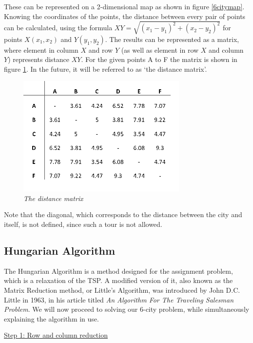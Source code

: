 \noindent These can be represented on a 2-dimensional map as shown in figure \ref{6citymap}. Knowing the coordinates of the points, the distance between every pair of points can be calculated, using the formula $XY=\sqrt{(x_1-y_1)^2+(x_2-y_2)^2}$  for points $X(x_1, x_2)$ and $Y(y_1, y_2)$. The results can be represented as a matrix, where element in column $X$ and row $Y$ (as well as element in row $X$ and column $Y$) represents distance $XY$. For the given points A to F the matrix is shown in figure \ref{distancematrix}. In the future, it will be referred to as `the distance matrix'.

\begin{figure}[h] 
	\centering
	\includegraphics[height=6cm]{distancematrix}
	\caption{\textsl{The distance matrix}}
	\label{distancematrix}
\end{figure}
\noindent Note that the diagonal, which corresponds to the distance between the city and itself, is not defined, since such a tour is not allowed.

\subsection{Hungarian Algorithm}
\label{HA}

The Hungarian Algorithm is a method designed for the assignment problem, which is a relaxation of the TSP. A modified version of it, also known as the Matrix Reduction method, or Little’s Algorithm, was introduced by John D.C. Little in 1963, in his article titled \textit{An Algorithm For The Traveling Salesman Problem}. We will now proceed to solving our 6-city problem, while simultaneously explaining the algorithm in use.

\vspace{5mm}
\noindent
\underline{Step 1: Row and column reduction}
\vspace{1mm}

